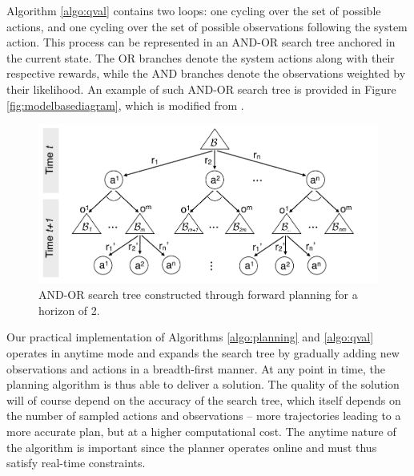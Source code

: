 Algorithm \ref{algo:qval} contains two loops: one cycling over the set of possible actions, and one cycling over the set of possible observations following the system action. This process can be represented in an AND-OR search tree anchored in the current state. The OR branches denote the system actions along with their respective rewards, while the AND branches denote the observations weighted by their likelihood. An example of such AND-OR search tree is provided in Figure \ref{fig:modelbasediagram}, which is modified from \cite{ross2008}.


\begin{figure}[h!]
\centering
\includegraphics[scale=0.30]{imgs/andortree.pdf}
\caption{AND-OR search tree constructed through forward planning for a horizon of 2.}
\label{fig:andortree}
\end{figure}

Our practical implementation of Algorithms \ref{algo:planning} and \ref{algo:qval} operates in anytime mode and expands the search tree by gradually adding new observations and actions in a breadth-first manner. At any point in time, the planning algorithm is thus able to deliver a solution. The quality of the solution will of course depend on the accuracy of the search tree, which itself depends on the number of sampled actions and observations -- more trajectories leading to a more accurate plan, but at a higher computational cost.  The anytime nature of the algorithm is important since the planner operates online and must thus satisfy real-time constraints.  

